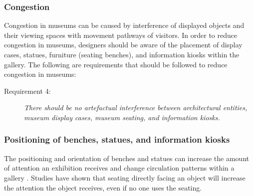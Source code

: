 \documentclass[12pt]{ucthesis}
\begin{document}
\begin{figure}[H]
\centering
{}
\hspace{10 mm}
\end{figure}


\subsubsection{Congestion}
Congestion in museums can be caused by interference of displayed objects and their viewing spaces with movement pathways of visitors. In order to reduce congestion in museums, designers should be aware of the placement of display cases, statues, furniture (seating benches), and information kiosks within the gallery. The following are requirements that should be followed to reduce congestion in museums:

\begin{description}
\item[Requirement 4:] \emph{There should be no artefactual interference between architectural entities, museum display cases, museum seating, and information kiosks.}
\end{description}


\subsubsection{Positioning of benches, statues, and information kiosks}
The positioning and orientation of benches and statues can increase the amount of attention an exhibition receives and change circulation patterns within a gallery \cite{Stavroulaki} \cite{Museum}. Studies have shown that seating directly facing an object will increase the attention the object receives, even if no one uses the seating. 
\end{document}
